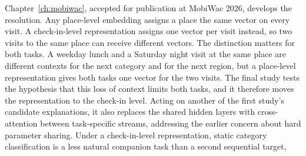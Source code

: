 Chapter~\ref{ch:mobiwac}, accepted for publication at MobiWac 2026, develops the
resolution.
Any place-level embedding assigns a place the same vector on every visit. A
check-in-level representation assigns one vector per visit instead, so two visits to
the same place can receive different vectors. The distinction matters for both tasks.
A weekday lunch and a Saturday night visit at the same place are different contexts
for the next category and for the next region, but a place-level representation gives
both tasks one vector for the two visits. The final study tests the hypothesis that
this loss of context limits both tasks, and it therefore moves the representation to
the check-in level. Acting on another of the first study's candidate explanations, it also replaces
the shared hidden layers with cross-attention between task-specific streams, addressing
the earlier concern about hard parameter sharing. Under a check-in-level representation, static
category classification is a less natural companion task than a second sequential target,

